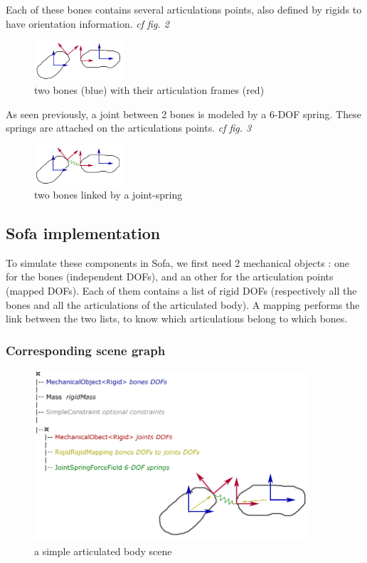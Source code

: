 Each of these bones contains several articulations points, also defined by rigids to have orientation information. \textsl{cf fig. 2}
\begin{figure}[htpb]
	\centering
		\includegraphics[width=0.30\textwidth]{articulatedbodies/softArt_G2.png}
	\caption{two bones (blue) with their articulation frames (red)}
\end{figure}

As seen previously, a joint between 2 bones is modeled by a 6-DOF spring. These springs are attached on the articulations points.    \textsl{cf fig. 3}
\begin{figure}[htpb]
	\centering
		\includegraphics[width=0.30\textwidth]{articulatedbodies/softArt_G3.png}
	\caption{two bones linked by a joint-spring}
\end{figure}



\subsection{Sofa implementation}

To simulate these components in Sofa, we first need 2 mechanical objects : one for the bones (independent DOFs), and an other for the articulation points (mapped DOFs).
Each of them contains a list of rigid DOFs (respectively all the bones and all the articulations of the articulated body).
A mapping performs the link between the two lists, to know which articulations belong to which bones.


\subsubsection{Corresponding scene graph}
\begin{figure}[htpb]
	\centering
		\includegraphics[width=0.90\textwidth]{articulatedbodies/scene_graph.png}
	\caption{a simple articulated body scene}
\end{figure}

